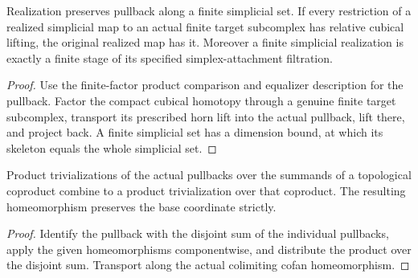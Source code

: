 \begin{proposition}
  \label{prop:realization-finite-lifting-reduction}
  \leanok
  Realization preserves pullback along a finite simplicial set. If every restriction of a realized simplicial map to an actual finite target subcomplex has relative cubical lifting, the original realized map has it. Moreover a finite simplicial realization is exactly a finite stage of its specified simplex-attachment filtration.
\end{proposition}
\begin{proof}
  Use the finite-factor product comparison and equalizer description for the pullback. Factor the compact cubical homotopy through a genuine finite target subcomplex, transport its prescribed horn lift into the actual pullback, lift there, and project back. A finite simplicial set has a dimension bound, at which its skeleton equals the whole simplicial set.
  \leanok
\end{proof}

\begin{proposition}
  \label{prop:coproduct-pullback-product}
  \leanok
  Product trivializations of the actual pullbacks over the summands of a topological coproduct combine to a product trivialization over that coproduct. The resulting homeomorphism preserves the base coordinate strictly.
\end{proposition}
\begin{proof}
  Identify the pullback with the disjoint sum of the individual pullbacks, apply the given homeomorphisms componentwise, and distribute the product over the disjoint sum. Transport along the actual colimiting cofan homeomorphism.
  \leanok
\end{proof}

